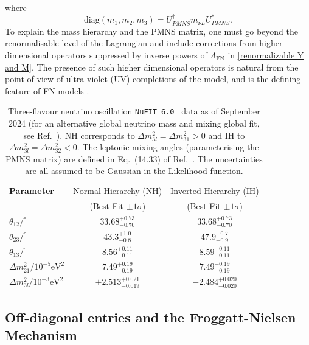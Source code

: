 \documentclass[11pt,letterpaper]{article}
\begin{document}
where 
\begin{equation} \label{eqn:PMNSdefn2}
    \text{diag}(m_1, m_2, m_3) = U_{PMNS}^\dagger m_{\nu L} U_{PMNS}^*.
\end{equation}
To explain the mass hierarchy and the PMNS matrix, one must go beyond the
renormalisable level of the Lagrangian and include
corrections from higher-dimensional operators suppressed by inverse powers of
$\Lambda_\text{FN}$ in \cref{renormalizable Y and M}. The presence of such higher
dimensional operators is natural from the point of view of ultra-violet (UV) completions of the model, and is the defining feature of FN models \cite{Froggatt:1978nt}.
\begin{table}[ht]
\centering
\setlength{\tabcolsep}{10pt}
\renewcommand{\arraystretch}{1.3}
\begin{tabular}{| l | c |c |} \hline
    \textbf{Parameter} & Normal Hierarchy (NH)& Inverted Hierarchy (IH) \\
    & (Best Fit $\pm 1\sigma$) & (Best Fit $\pm 1\sigma$) \\ \hline
    $\theta_{12}/^\circ$ & $33.68^{+0.73}_{-0.70}$ & $33.68^{+0.73}_{-0.70}$ \\
    $\theta_{23}/^\circ$ & $43.3^{+1.0}_{-0.8}$ & $47.9^{+0.7}_{-0.9}$ \\
    $\theta_{13}/^\circ$ & $8.56^{+0.11}_{-0.11}$ &  $8.59^{+0.11}_{-0.11}$  \\
    $\Delta m_{21}^2/10^{-5}\text{eV}^2$ & $7.49^{+0.19}_{-0.19}$ & $7.49^{+0.19}_{-0.19}$\\
    $\Delta m_{3l}^2/10^{-3}\text{eV}^2$ & $+2.513^{+0.021}_{-0.019}$ & $-2.484^{+0.020}_{-0.020}$\\
    \hline
\end{tabular}
\caption{Three-flavour neutrino oscillation {\tt NuFIT 6.0}~\cite{Esteban:2024eli} data as of September 2024 (for an alternative 
  global neutrino mass and mixing global fit, see Ref.~\cite{Capozzi:2025wyn}). 
  NH corresponds to $\Delta m_{3l}^2=\Delta m_{31}^2>0$ and  IH to $\Delta m_{3l}^2 = \Delta m_{32}^2<0$. 
The leptonic mixing angles (parameterising
the PMNS matrix) are defined in Eq.~(14.33) of Ref.~\cite{PDG}. The
uncertainties are all assumed to be Gaussian in the Likelihood function.
\label{tab:neutrino_angles_masses}}
\end{table}

\subsection{Off-diagonal entries and the Froggatt-Nielsen Mechanism} \label{sec:offdiag}
\end{document}
